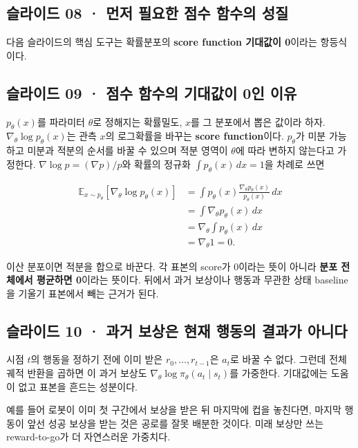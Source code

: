 \documentclass[11pt,a4paper]{article}
\begin{document}
\subsection{슬라이드 08 · 먼저 필요한 점수 함수의 성질}

다음 슬라이드의 핵심 도구는 확률분포의 \textbf{score function 기대값이 0}이라는 항등식이다.\par

\subsection{슬라이드 09 · 점수 함수의 기대값이 0인 이유}

$p_\theta(x)$를 파라미터 $\theta$로 정해지는 확률밀도, $x$를 그 분포에서 뽑은 값이라 하자. $\nabla_\theta\log p_\theta(x)$는 관측 $x$의 로그확률을 바꾸는 \textbf{score function}이다. $p_\theta$가 미분 가능하고 미분과 적분의 순서를 바꿀 수 있으며 적분 영역이 $\theta$에 따라 변하지 않는다고 가정한다. $\nabla\log p=(\nabla p)/p$와 확률의 정규화 $\int p_\theta(x)\,dx=1$을 차례로 쓰면\par

\[
\begin{aligned}
\mathbb E_{x\sim p_\theta}\!\left[\nabla_\theta\log p_\theta(x)\right]
&=\int p_\theta(x)\frac{\nabla_\theta p_\theta(x)}{p_\theta(x)}\,dx\\
&=\int\nabla_\theta p_\theta(x)\,dx\\
&=\nabla_\theta\int p_\theta(x)\,dx\\
&=\nabla_\theta 1=0.
\end{aligned}
\]

이산 분포이면 적분을 합으로 바꾼다. 각 표본의 score가 0이라는 뜻이 아니라 \textbf{분포 전체에서 평균하면 0}이라는 뜻이다. 뒤에서 과거 보상이나 행동과 무관한 상태 baseline을 기울기 표본에서 빼는 근거가 된다.\par

\subsection{슬라이드 10 · 과거 보상은 현재 행동의 결과가 아니다}

시점 $t$의 행동을 정하기 전에 이미 받은 $r_0,\ldots,r_{t-1}$은 $a_t$로 바꿀 수 없다. 그런데 전체 궤적 반환을 곱하면 이 과거 보상도 $\nabla_\theta\log\pi_\theta(a_t\mid s_t)$를 가중한다. 기대값에는 도움이 없고 표본을 흔드는 성분이다.\par

예를 들어 로봇이 이미 첫 구간에서 보상을 받은 뒤 마지막에 컵을 놓친다면, 마지막 행동이 앞선 성공 보상을 받는 것은 공로를 잘못 배분한 것이다. 미래 보상만 쓰는 reward-to-go가 더 자연스러운 가중치다.\par
\end{document}
